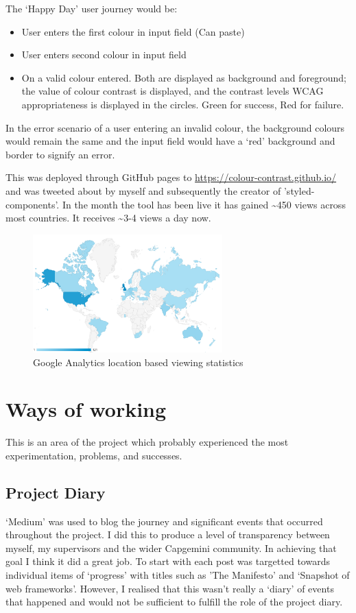 The `Happy Day' user journey would be:
\begin{itemize}
\item User enters the first colour in input field (Can paste)
\item User enters second colour in input field
\item On a valid colour entered. Both are displayed as background and
foreground; the value of colour contrast is displayed, and the contrast
levels WCAG appropriateness is displayed in the circles. Green for success, Red
for failure.
\end{itemize}

In the error scenario of a user entering an invalid colour, the background
colours would remain the same and the input field would have a `red'
background and border to signify an error.

This was deployed through GitHub pages to \url{https://colour-contrast.github.io/}
and was tweeted about by myself and
subsequently the creator of 'styled-components'. In the month
the tool has been live it has gained \textasciitilde450 views across most
countries. It receives \textasciitilde3-4 views a day now.

\begin{figure}[H]
\centering
\includegraphics[width=0.65\textwidth]{figures/colour_contrast_analytics}
\captionsetup{justification=centering}
\caption{Google Analytics location based viewing statistics
\label{fig:colour_contrast_analytics}}
\end{figure}


\section{Ways of working}
This is an area of the project which probably experienced the most
experimentation, problems, and successes.

\subsection{Project Diary}
`Medium' was used to blog the journey and significant events that
occurred throughout the project. I did this to produce a level of transparency
between myself, my supervisors and the wider Capgemini community. In
achieving that goal I think it did a great job. To start with each post was
targetted towards individual items of `progress' with titles such as 'The
Manifesto' and `Snapshot of web frameworks'. However, I realised that this
wasn't really a `diary' of events that happened and would not be sufficient
to fulfill the role of the project diary.

